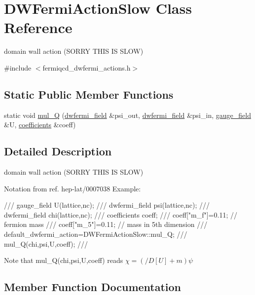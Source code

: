 \hypertarget{class_d_w_fermi_action_slow}{}\section{D\+W\+Fermi\+Action\+Slow Class Reference}
\label{class_d_w_fermi_action_slow}


domain wall action (S\+O\+R\+RY T\+H\+IS IS S\+L\+OW)  




{\ttfamily \#include $<$fermiqcd\+\_\+dwfermi\+\_\+actions.\+h$>$}

\subsection*{Static Public Member Functions}
\begin{DoxyCompactItemize}
\item 
static void \hyperlink{class_d_w_fermi_action_slow_a1d869c15a2d6fd01059d4088693e1898}{mul\+\_\+Q} (\hyperlink{classdwfermi__field}{dwfermi\+\_\+field} \&psi\+\_\+out, \hyperlink{classdwfermi__field}{dwfermi\+\_\+field} \&psi\+\_\+in, \hyperlink{classgauge__field}{gauge\+\_\+field} \&U, \hyperlink{classcoefficients}{coefficients} \&coeff)
\end{DoxyCompactItemize}


\subsection{Detailed Description}
domain wall action (S\+O\+R\+RY T\+H\+IS IS S\+L\+OW) 

Notation from ref. hep-\/lat/0007038 Example\+: \begin{DoxyVerb}/// gauge_field U(lattice,nc);
/// dwfermi_field psi(lattice,nc);
/// dwfermi_field chi(lattice,nc);
/// coefficients coeff;
/// coeff["m_f"]=0.11; // fermion mass
/// coeff["m_5"]=0.11; // mass in 5th dimension
/// default_dwfermi_action=DWFermiActionSlow::mul_Q;
/// mul_Q(chi,psi,U,coeff);
/// \end{DoxyVerb}
 Note that mul\+\_\+\+Q(chi,psi,\+U,coeff) reads $ \chi=(/\!\!\!D[U]+m)\psi $ 

\subsection{Member Function Documentation}
\mbox{\label{class_d_w_fermi_action_slow_a1d869c15a2d6fd01059d4088693e1898}} 
